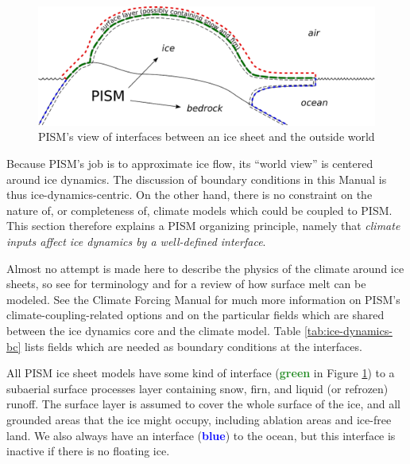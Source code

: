 \begin{figure}[ht]
  \centering
  \includegraphics[width=6in]{figs/climate-cartoon.pdf}
  \caption{PISM's view of interfaces between an ice sheet and the outside world}
  \label{fig:climate-inputs}
\end{figure}

Because PISM's job is to approximate ice flow, its ``world view'' is centered around ice dynamics.  The discussion of boundary conditions in this Manual is thus ice-dynamics-centric.  On the other hand, there is no constraint on the nature of, or completeness of, climate models which could be coupled to PISM.  This section therefore explains a PISM organizing principle, namely that \emph{climate inputs affect ice dynamics by a well-defined interface}.

Almost no attempt is made here to describe the physics of the climate around ice sheets, so see \cite{massbalanceglossary} for terminology and \cite{Hock05} for a review of how surface melt can be modeled.  See the Climate Forcing Manual for much more information on PISM's climate-coupling-related options and on the particular fields which are shared between the ice dynamics core and the climate model.  Table \ref{tab:ice-dynamics-bc} lists fields which are needed as boundary conditions at the interfaces.

All PISM ice sheet models have some kind of interface (\textcolor{ForestGreen}{\textbf{green}} in Figure \ref{fig:climate-inputs}) to a subaerial surface processes layer containing snow, firn, and liquid (or refrozen) runoff.  The surface layer is assumed to cover the whole surface of the ice, and all grounded areas that the ice might occupy, including ablation areas and ice-free land.  We also always have an interface (\textcolor{blue}{\textbf{blue}}) to the ocean, but this interface is inactive if there is no floating ice.

